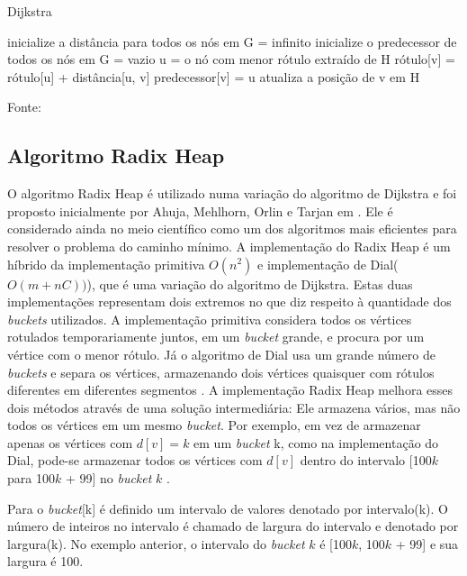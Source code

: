 \begin{algorithm}
\caption{Dijkstra}
\begin{algorithmic}[1]
\State inicialize a distância para todos os nós em G = infinito
\State inicialize o predecessor de todos os nós em G = vazio
  \State u = o nó com menor rótulo extraído de H
      \State rótulo[v] = rótulo[u] + distância[u, v]
      \State predecessor[v] = u
      \State atualiza a posição de v em H
    \EndIf
  \EndFor
\EndWhile
\end{algorithmic}
Fonte: \cite{cormen}
\label{newdijkstra}
\end{algorithm}
\FloatBarrier

\subsection{Algoritmo Radix Heap}
O algoritmo Radix Heap é utilizado numa variação do algoritmo de Dijkstra e foi proposto inicialmente por
Ahuja, Mehlhorn, Orlin e Tarjan em \cite{ahuja}.
Ele é considerado ainda no meio científico como um dos algoritmos mais eficientes para resolver o
problema do caminho mínimo.
A implementação do Radix Heap é um híbrido da implementação primitiva $O(n^2)$ e implementação de Dial($O(m + nC))$), que
é uma variação do algoritmo de Dijkstra. 
Estas duas implementações representam dois extremos no que diz respeito à quantidade dos \textit{buckets} utilizados.
A implementação primitiva considera todos os vértices rotulados temporariamente juntos, em um \textit{bucket} grande,
e procura por um vértice com o menor rótulo. Já o algoritmo de Dial usa um grande número de \textit{buckets} e separa os vértices,
armazenando dois vértices quaisquer com rótulos diferentes em diferentes segmentos \cite{bookahuja}.
A implementação Radix Heap melhora esses dois métodos através de uma solução intermediária:
Ele armazena vários, mas não todos os vértices em um mesmo \textit{bucket}. Por exemplo, em vez de armazenar
apenas os vértices com $d[v] = k$ em um \textit{bucket} k, como na implementação do Dial,
pode-se armazenar todos os vértices com $d[v]$ dentro do intervalo [100$k$ para 100$k$ + 99] no \textit{bucket} $k$ \cite{bookahuja}.

Para o \textit{bucket}[k] é definido um intervalo de valores denotado por intervalo(k). O número de inteiros
no intervalo é chamado de largura do intervalo e denotado por largura(k).
No exemplo anterior, o intervalo do \textit{bucket} $k$ é [100$k$, 100$k$ + 99] e sua largura é 100. 

